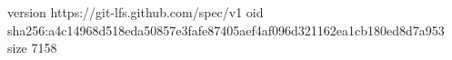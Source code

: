 version https://git-lfs.github.com/spec/v1
oid sha256:a4c14968d518eda50857e3fafe87405aef4af096d321162ea1cb180ed8d7a953
size 7158
